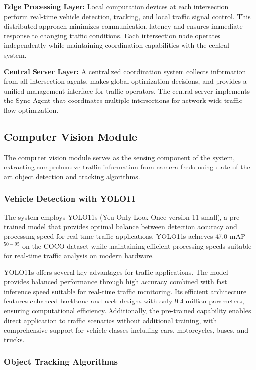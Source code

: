 \textbf{Edge Processing Layer:} Local computation devices at each intersection perform real-time vehicle detection, tracking, and local traffic signal control. This distributed approach minimizes communication latency and ensures immediate response to changing traffic conditions. Each intersection node operates independently while maintaining coordination capabilities with the central system.

\textbf{Central Server Layer:} A centralized coordination system collects information from all intersection agents, makes global optimization decisions, and provides a unified management interface for traffic operators. The central server implements the Sync Agent that coordinates multiple intersections for network-wide traffic flow optimization.

\subsection{Computer Vision Module}\label{subsec2a-2}

The computer vision module serves as the sensing component of the system, extracting comprehensive traffic information from camera feeds using state-of-the-art object detection and tracking algorithms.

\subsubsection{Vehicle Detection with YOLO11}

The system employs YOLO11s (You Only Look Once version 11 small), a pre-trained model that provides optimal balance between detection accuracy and processing speed for real-time traffic applications. YOLO11s achieves 47.0 mAP$^{50-95}$ on the COCO dataset while maintaining efficient processing speeds suitable for real-time traffic analysis on modern hardware.

YOLO11s offers several key advantages for traffic applications. The model provides balanced performance through high accuracy combined with fast inference speed suitable for real-time traffic monitoring. Its efficient architecture features enhanced backbone and neck designs with only 9.4 million parameters, ensuring computational efficiency. Additionally, the pre-trained capability enables direct application to traffic scenarios without additional training, with comprehensive support for vehicle classes including cars, motorcycles, buses, and trucks.

\subsubsection{Object Tracking Algorithms}

